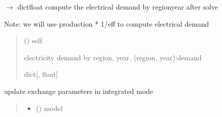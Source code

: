 \documentclass[letterpaper,10pt,english]{sphinxmanual}
\begin{document}
\begin{fulllineitems}
\begin{fulllineitems}
\label{\detokenize{src.models.hydrogen.model.h2_model:src.models.hydrogen.model.h2_model.H2Model.poll_electric_demand}}
\pysigstartsignatures
\pysiglinewithargsret
{}
{}
{{ $\rightarrow$ dict\DUrole{p}{{[}}{\hyperref[\detokenize{src.integrator.utilities:src.integrator.utilities.HI}]{\sphinxcrossref{HI}}}float\DUrole{p}{{]}}}}
\pysigstopsignatures
\sphinxAtStartPar
compute the electrical demand by region\sphinxhyphen{}year after solve

\sphinxAtStartPar
Note:  we will use production * 1/eff to compute electrical demand
\begin{quote}\begin{description}
\sphinxAtStartPar
{} ({\hyperref[\detokenize{src.models.hydrogen.model.h2_model:src.models.hydrogen.model.h2_model.H2Model}]{}}) \textendash{} self

\sphinxAtStartPar
electricity demand by region, year. (region, year):demand

\sphinxAtStartPar
dict{[}{\hyperref[\detokenize{src.integrator.utilities:src.integrator.utilities.HI}]{}}, float{]}

\end{description}\end{quote}

\end{fulllineitems}


\begin{fulllineitems}
\label{\detokenize{src.models.hydrogen.model.h2_model:src.models.hydrogen.model.h2_model.H2Model.update_exchange_params}}
\pysigstartsignatures
\pysiglinewithargsret
{}
{\sphinxparamcomma {}}
{}
\pysigstopsignatures
\sphinxAtStartPar
update exchange parameters in integrated mode
\begin{quote}\begin{description}
\begin{itemize}
\item {} 
\sphinxAtStartPar
{} ({\hyperref[\detokenize{src.models.hydrogen.model.h2_model:src.models.hydrogen.model.h2_model.H2Model}]{}}) \textendash{} model


\end{itemize}
\end{description}
\end{quote}
\end{fulllineitems}
\end{fulllineitems}
\end{document}
